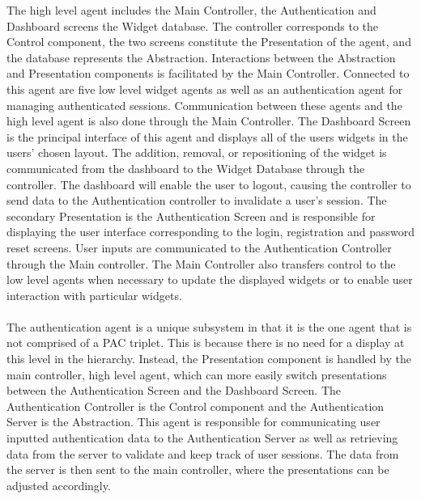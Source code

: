 \documentclass[]{article}
\begin{document}
The high level agent includes the Main Controller, the Authentication and Dashboard screens the Widget database. The controller corresponds to the Control component, the two screens constitute the Presentation of the agent, and the database represents the Abstraction. Interactions between the Abstraction and Presentation components is facilitated by the Main Controller. Connected to this agent are five low level widget agents as well as an authentication agent for managing authenticated sessions. Communication between these agents and the high level agent is also done through the Main Controller. 
The Dashboard Screen is the principal interface of this agent and displays all of the users widgets in the users' chosen layout. The addition, removal, or repositioning of the widget is communicated from the dashboard to the Widget Database through the controller. The dashboard will enable the user to logout, causing the controller to send data to the Authentication controller to invalidate a user's session. The secondary Presentation is the Authentication Screen and is responsible for displaying the user interface corresponding to the login, registration and password reset screens. User inputs are communicated to the Authentication Controller through the Main controller. The Main Controller also transfers control to the low level agents when necessary to update the displayed widgets or to enable user interaction with particular widgets.
\\ \\
The authentication agent is a unique subsystem in that it is the one agent that is not comprised of a PAC triplet. This is because there is no need for a display at this level in the hierarchy. Instead, the Presentation component is handled by the main controller, high level agent, which can more easily switch presentations between the Authentication Screen and the Dashboard Screen. The Authentication Controller is the Control component and the Authentication Server is the Abstraction.
This agent is responsible for communicating user inputted authentication data to the Authentication Server as well as retrieving data from the server to validate and keep track of user sessions. The data from the server is then sent to the main controller, where the presentations can be adjusted accordingly.
\\ \\
\end{document}
